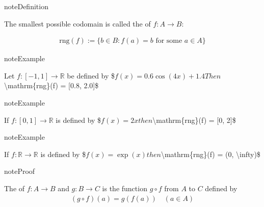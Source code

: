 \documentclass[letterpaper,10pt,english]{jupyterBook}
\begin{document}
\begin{sphinxadmonition}{note}{Definition}

\sphinxAtStartPar
The smallest possible codomain is called the  of \(f \colon A \to B\):
\end{sphinxadmonition}
\begin{equation*}
\begin{split}
\mathrm{rng}(f) := \{ b \in B : f(a) = b \text{ for some } a \in A \} 
\end{split}
\end{equation*}
\begin{figure}[htbp]
\centering

\noindent{}
\end{figure}

\begin{sphinxadmonition}{note}{Example}

\sphinxAtStartPar
Let \(f \colon [-1, 1] \to \mathbb{R}\) be defined by
\$\(
f(x) =  0.6 \cos(4 x) + 1.4
\)\(
Then \)\textbackslash{}mathrm\{rng\}(f) = {[}0.8, 2.0{]}\$
\end{sphinxadmonition}

\begin{figure}[htbp]
\centering

\noindent{}
\end{figure}

\begin{sphinxadmonition}{note}{Example}

\sphinxAtStartPar
If \( f \colon [0, 1] \to \mathbb{R}\) is defined by
\$\(
f(x) = 2x
\)\(
then \)\textbackslash{}mathrm\{rng\}(f) = {[}0, 2{]}\$
\end{sphinxadmonition}

\begin{sphinxadmonition}{note}{Example}

\sphinxAtStartPar
If \(f \colon \mathbb{R} \to \mathbb{R}\) is defined by
\$\(
f(x) = \exp(x) 
\)\(
then \)\textbackslash{}mathrm\{rng\}(f) = (0, \textbackslash{}infty)\$
\end{sphinxadmonition}

\begin{sphinxadmonition}{note}{Proof}

\sphinxAtStartPar
The  of \(f \colon A \to B\) and \(g \colon B \to C\) is the
function \(g \circ f\) from \(A\) to \(C\) defined by
\begin{equation*}
\begin{split}
(g \circ f)(a) = g(f(a)) \quad (a \in A)
\end{split}
\end{equation*}\end{sphinxadmonition}
\end{document}
